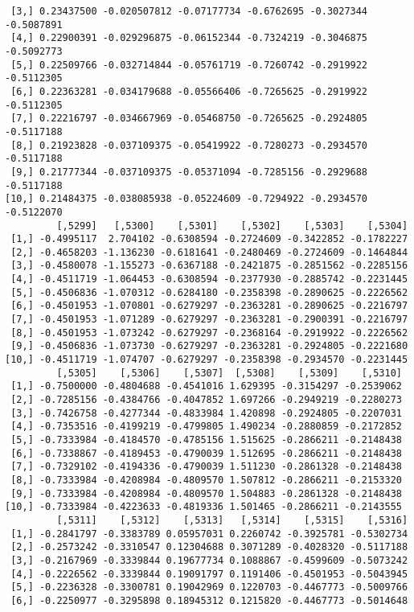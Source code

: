 \documentclass[
  letterpaper,
  DIV=11,
  numbers=noendperiod]{scrreprt}
\begin{document}
\begin{verbatim}
 [3,] 0.23437500 -0.020507812 -0.07177734 -0.6762695 -0.3027344 -0.5087891
 [4,] 0.22900391 -0.029296875 -0.06152344 -0.7324219 -0.3046875 -0.5092773
 [5,] 0.22509766 -0.032714844 -0.05761719 -0.7260742 -0.2919922 -0.5112305
 [6,] 0.22363281 -0.034179688 -0.05566406 -0.7265625 -0.2919922 -0.5112305
 [7,] 0.22216797 -0.034667969 -0.05468750 -0.7265625 -0.2924805 -0.5117188
 [8,] 0.21923828 -0.037109375 -0.05419922 -0.7280273 -0.2934570 -0.5117188
 [9,] 0.21777344 -0.037109375 -0.05371094 -0.7285156 -0.2929688 -0.5117188
[10,] 0.21484375 -0.038085938 -0.05224609 -0.7294922 -0.2934570 -0.5122070
         [,5299]   [,5300]    [,5301]    [,5302]    [,5303]    [,5304]
 [1,] -0.4995117  2.704102 -0.6308594 -0.2724609 -0.3422852 -0.1782227
 [2,] -0.4658203 -1.136230 -0.6181641 -0.2480469 -0.2724609 -0.1464844
 [3,] -0.4580078 -1.155273 -0.6367188 -0.2421875 -0.2851562 -0.2285156
 [4,] -0.4511719 -1.064453 -0.6308594 -0.2377930 -0.2885742 -0.2231445
 [5,] -0.4506836 -1.070312 -0.6284180 -0.2358398 -0.2890625 -0.2226562
 [6,] -0.4501953 -1.070801 -0.6279297 -0.2363281 -0.2890625 -0.2216797
 [7,] -0.4501953 -1.071289 -0.6279297 -0.2363281 -0.2900391 -0.2216797
 [8,] -0.4501953 -1.073242 -0.6279297 -0.2368164 -0.2919922 -0.2226562
 [9,] -0.4506836 -1.073730 -0.6279297 -0.2363281 -0.2924805 -0.2221680
[10,] -0.4511719 -1.074707 -0.6279297 -0.2358398 -0.2934570 -0.2231445
         [,5305]    [,5306]    [,5307]  [,5308]    [,5309]    [,5310]
 [1,] -0.7500000 -0.4804688 -0.4541016 1.629395 -0.3154297 -0.2539062
 [2,] -0.7285156 -0.4384766 -0.4047852 1.697266 -0.2949219 -0.2280273
 [3,] -0.7426758 -0.4277344 -0.4833984 1.420898 -0.2924805 -0.2207031
 [4,] -0.7353516 -0.4199219 -0.4799805 1.490234 -0.2880859 -0.2172852
 [5,] -0.7333984 -0.4184570 -0.4785156 1.515625 -0.2866211 -0.2148438
 [6,] -0.7338867 -0.4189453 -0.4790039 1.512695 -0.2866211 -0.2148438
 [7,] -0.7329102 -0.4194336 -0.4790039 1.511230 -0.2861328 -0.2148438
 [8,] -0.7333984 -0.4208984 -0.4809570 1.507812 -0.2866211 -0.2153320
 [9,] -0.7333984 -0.4208984 -0.4809570 1.504883 -0.2861328 -0.2148438
[10,] -0.7333984 -0.4223633 -0.4819336 1.501465 -0.2866211 -0.2143555
         [,5311]    [,5312]    [,5313]   [,5314]    [,5315]    [,5316]
 [1,] -0.2841797 -0.3383789 0.05957031 0.2260742 -0.3925781 -0.5302734
 [2,] -0.2573242 -0.3310547 0.12304688 0.3071289 -0.4028320 -0.5117188
 [3,] -0.2167969 -0.3339844 0.19677734 0.1088867 -0.4599609 -0.5073242
 [4,] -0.2226562 -0.3339844 0.19091797 0.1191406 -0.4501953 -0.5043945
 [5,] -0.2236328 -0.3300781 0.19042969 0.1220703 -0.4467773 -0.5009766
 [6,] -0.2250977 -0.3295898 0.18945312 0.1215820 -0.4467773 -0.5014648

\end{verbatim}
\end{document}
